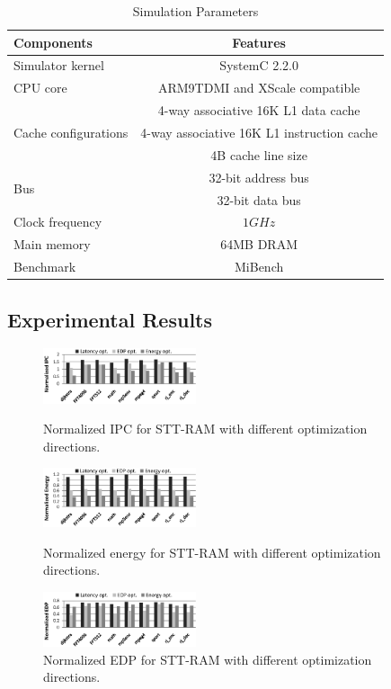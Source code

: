 \begin{table}[t]
\centering
\caption{Simulation Parameters}
\label{tb:parameters}
\vspace{-5pt}
\begin{tabular}{ l | c }
\hline \hline
Components & Features\\
\hline
Simulator kernel & SystemC 2.2.0\\
\hline
CPU core & ARM9TDMI and XScale compatible \\
\hline
\multirow{3}{*}{Cache configurations} & 4-way associative 16K L1 data cache \\
& 4-way associative 16K L1 instruction cache \\
& 4B cache line size \\
\hline
\multirow{2}{*}{Bus} & 32-bit address bus  \\
& 32-bit data bus \\
\hline
Clock frequency & $1GHz$ \\
\hline
Main memory & 64MB DRAM \\
\hline
Benchmark & MiBench \\
\hline\hline
\end{tabular}
\vspace{-10pt}
\end{table}

\subsection{Experimental Results}

\begin{figure}[t]
\centering
\includegraphics[width=0.4\textwidth]{fig/IPC}
\vspace{-10pt}
\caption{Normalized IPC for STT-RAM with different optimization directions.}
\label{fig:ipc}
\vspace{7pt}
\includegraphics[width=0.4\textwidth]{fig/Energy}
\vspace{-10pt}
\caption{Normalized energy for STT-RAM with different optimization directions.}
\label{fig:energy}
\vspace{7pt}
\includegraphics[width=0.4\textwidth]{fig/EDP}
\vspace{-10pt}
\caption{Normalized EDP for STT-RAM with different optimization directions.}
\label{fig:edp}
\vspace{-10pt}
\end{figure}

